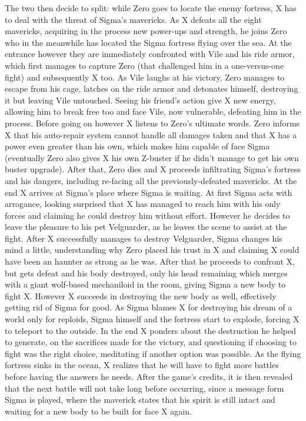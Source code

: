 The two then decide to split: while Zero goes to locate the enemy fortress, X has to deal with the threat of Sigma's mavericks. As X defeats all the eight mavericks, acquiring in the process new power-ups and strength, he joins Zero who in the meanwhile has located the Sigma fortress flying over the sea. At the entrance however they are immediately confronted with Vile and his ride armor, which first manages to capture Zero (that challenged him in a one-versus-one fight) and subsequently X too. As Vile laughs at his victory, Zero manages to escape from his cage, latches on the ride armor and detonates himself, destroying it but leaving Vile untouched. Seeing his friend's action give X new energy, allowing him to break free too and face Vile, now vulnerable, defeating him in the process. Before going on however X listens to Zero's ultimate words\cite{wiki:MMX_script}. Zero informs X that his auto-repair system cannot handle all damages taken and that X has a power even greater than his own, which makes him capable of face Sigma (eventually Zero also gives X his own Z-buster if he didn't manage to get his own buster upgrade). After that, Zero dies and X proceeds infiltrating Sigma's fortress and his dangers, including re-facing all the previously-defeated mavericks. At the end X arrives at Sigma's place where Sigma is waiting. At first Sigma acts with arrogance, looking surprised that X has managed to reach him with his only forces and claiming he could destroy him without effort. However he decides to leave the pleasure to his pet Velguarder, as he leaves the scene to assist at the fight. After X successfully manages to destroy Velguarder, Sigma changes his mind a little, understanding why Zero placed his trust in X and claiming X could have been an haunter as strong as he was. After that he proceeds to confront X, but gets defeat and his body destroyed, only his head remaining which merges with a giant wolf-based mechaniloid in the room, giving Sigma a new body to fight X. However X succeeds in destroying the new body as well, effectively getting rid of Sigma for good. As Sigma blames X for destroying his dream of a world only for reploids, Sigma himself and the fortress start to explode, forcing X to teleport to the outside. In the end X ponders about the destruction he helped to generate, on the sacrifices made for the victory, and questioning if choosing to fight was the right choice, meditating if another option was possible. As the flying fortress sinks in the ocean, X realizes that he will have to fight more battles before having the answers he needs. 
After the game's credits, it is then revealed that the next battle will not take long before occurring, since a message form Sigma is played, where the maverick states that his spirit is still intact and waiting for a new body to be built for face X again.

